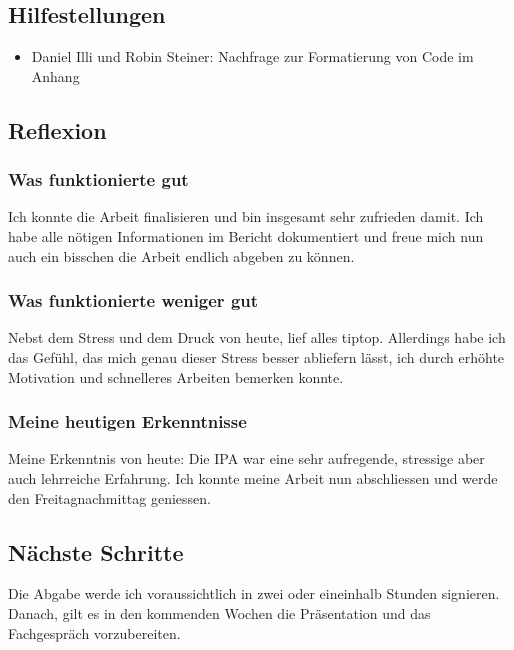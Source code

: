 \subsection*{Hilfestellungen}
\begin{itemize}
    \item Daniel Illi und Robin Steiner: Nachfrage zur Formatierung von Code im Anhang
\end{itemize}

\subsection*{Reflexion}

\subsubsection*{Was funktionierte gut}
Ich konnte die Arbeit finalisieren und bin insgesamt sehr zufrieden damit. Ich habe alle nötigen Informationen im Bericht dokumentiert 
und freue mich nun auch ein bisschen die Arbeit endlich abgeben zu können.

\subsubsection*{Was funktionierte weniger gut}
Nebst dem Stress und dem Druck von heute, lief alles tiptop. Allerdings habe ich das Gefühl, das mich genau dieser 
Stress besser abliefern lässt, ich durch erhöhte Motivation und schnelleres Arbeiten bemerken konnte.

\subsubsection*{Meine heutigen Erkenntnisse}
Meine Erkenntnis von heute: Die IPA war eine sehr aufregende, stressige aber auch lehrreiche Erfahrung. Ich konnte meine Arbeit nun abschliessen 
und werde den Freitagnachmittag geniessen.

\subsection*{Nächste Schritte}
Die Abgabe werde ich voraussichtlich in zwei oder eineinhalb Stunden signieren. Danach, gilt es in den kommenden Wochen die Präsentation und das 
Fachgespräch vorzubereiten.

\pagebreak
